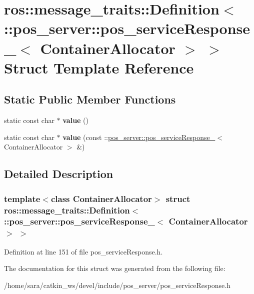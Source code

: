\hypertarget{structros_1_1message__traits_1_1Definition_3_01_1_1pos__server_1_1pos__serviceResponse___3_01ContainerAllocator_01_4_01_4}{}\section{ros\+:\+:message\+\_\+traits\+:\+:Definition$<$ \+:\+:pos\+\_\+server\+:\+:pos\+\_\+service\+Response\+\_\+$<$ Container\+Allocator $>$ $>$ Struct Template Reference}
\label{structros_1_1message__traits_1_1Definition_3_01_1_1pos__server_1_1pos__serviceResponse___3_01ContainerAllocator_01_4_01_4}
\subsection*{Static Public Member Functions}
\begin{DoxyCompactItemize}
\item 
\mbox{\label{structros_1_1message__traits_1_1Definition_3_01_1_1pos__server_1_1pos__serviceResponse___3_01ContainerAllocator_01_4_01_4_ad11760bb8934edfe3c37cafbea0a312e}} 
static const char $\ast$ {\bfseries value} ()
\item 
\mbox{\label{structros_1_1message__traits_1_1Definition_3_01_1_1pos__server_1_1pos__serviceResponse___3_01ContainerAllocator_01_4_01_4_a5366588b15edac6461e6f4bf5ea8666e}} 
static const char $\ast$ {\bfseries value} (const \+::\hyperlink{structpos__server_1_1pos__serviceResponse__}{pos\+\_\+server\+::pos\+\_\+service\+Response\+\_\+}$<$ Container\+Allocator $>$ \&)
\end{DoxyCompactItemize}


\subsection{Detailed Description}
\subsubsection*{template$<$class Container\+Allocator$>$\newline
struct ros\+::message\+\_\+traits\+::\+Definition$<$ \+::pos\+\_\+server\+::pos\+\_\+service\+Response\+\_\+$<$ Container\+Allocator $>$ $>$}



Definition at line 151 of file pos\+\_\+service\+Response.\+h.



The documentation for this struct was generated from the following file\+:\begin{DoxyCompactItemize}
\item 
/home/sara/catkin\+\_\+ws/devel/include/pos\+\_\+server/pos\+\_\+service\+Response.\+h\end{DoxyCompactItemize}
